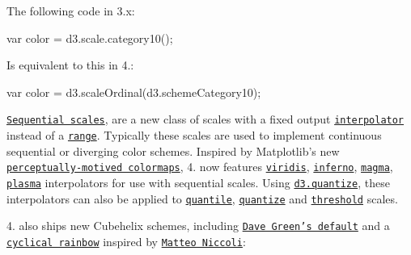 The following code in 3.\+x\+:


\begin{DoxyCode}
var color = d3.scale.category10();
\end{DoxyCode}


Is equivalent to this in 4.\+:


\begin{DoxyCode}
var color = d3.scaleOrdinal(d3.schemeCategory10);
\end{DoxyCode}


\href{https://github.com/d3/d3-scale/blob/master/README.md#scaleSequential}{\tt Sequential scales}, are a new class of scales with a fixed output \href{https://github.com/d3/d3-scale/blob/master/README.md#sequential_interpolator}{\tt interpolator} instead of a \href{https://github.com/d3/d3-scale/blob/master/README.md#continuous_range}{\tt range}. Typically these scales are used to implement continuous sequential or diverging color schemes. Inspired by Matplotlib’s new \href{https://bids.github.io/colormap/}{\tt perceptually-\/motived colormaps}, 4. now features \href{https://github.com/d3/d3-scale/blob/master/README.md#interpolateViridis}{\tt viridis}, \href{https://github.com/d3/d3-scale/blob/master/README.md#interpolateInferno}{\tt inferno}, \href{https://github.com/d3/d3-scale/blob/master/README.md#interpolateMagma}{\tt magma}, \href{https://github.com/d3/d3-scale/blob/master/README.md#interpolatePlasma}{\tt plasma} interpolators for use with sequential scales. Using \href{https://github.com/d3/d3-interpolate/blob/master/README.md#quantize}{\tt d3.\+quantize}, these interpolators can also be applied to \href{https://github.com/d3/d3-scale/blob/master/README.md#quantile-scales}{\tt quantile}, \href{https://github.com/d3/d3-scale/blob/master/README.md#quantize-scales}{\tt quantize} and \href{https://github.com/d3/d3-scale/blob/master/README.md#threshold-scales}{\tt threshold} scales.

\href{https://github.com/d3/d3-scale/blob/master/README.md#interpolateViridis}{\tt } \href{https://github.com/d3/d3-scale/blob/master/README.md#interpolateInferno}{\tt } \href{https://github.com/d3/d3-scale/blob/master/README.md#interpolateMagma}{\tt } \href{https://github.com/d3/d3-scale/blob/master/README.md#interpolatePlasma}{\tt }

4. also ships new Cubehelix schemes, including \href{https://github.com/d3/d3-scale/blob/master/README.md#interpolateCubehelixDefault}{\tt Dave Green’s default} and a \href{https://github.com/d3/d3-scale/blob/master/README.md#interpolateRainbow}{\tt cyclical rainbow} inspired by \href{https://mycarta.wordpress.com/2013/02/21/perceptual-rainbow-palette-the-method/}{\tt Matteo Niccoli}\+:

